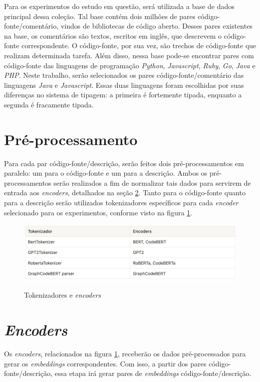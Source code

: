 Para os experimentos do estudo em questão, será utilizada a base de dados principal dessa coleção. Tal base contém dois milhões de pares código-fonte/comentário, vindos de bibliotecas de código aberto. Desses pares existentes na base, os comentários são textos, escritos em inglês, que descrevem o código-fonte correspondente. O código-fonte, por sua vez, são trechos de código-fonte que realizam determinada tarefa. Além disso, nessa base pode-se encontrar pares com código-fonte das linguagens de programação \textit{Python}, \textit{Javascript}, \textit{Ruby}, \textit{Go}, \textit{Java} e \textit{PHP}. Neste trabalho, serão selecionados os pares código-fonte/comentário das linguagens \textit{Java} e \textit{Javascript}. Essas duas linguagens foram escolhidas por suas diferenças no sistema de tipagem: a primeira é fortemente tipada, enquanto a segunda é fracamente tipada.

\section{Pré-processamento}
\label{sec:methodology:pre-processing}
Para cada par código-fonte/descrição, serão feitos dois pré-processamentos em paralelo: um para o código-fonte e um para a descrição. Ambos os pré-processamentos serão realizados a fim de normalizar tais dados para servirem de entrada aos \textit{encoders}, detalhados na seção \ref{sec:methodology:encoders}. Tanto para o código-fonte quanto para a descrição serão utilizados tokenizadores específicos para cada \textit{encoder} selecionado para os experimentos, conforme visto na figura \ref{fig:metodology-tokenizers}.

\begin{figure}[htbp]
    \centering
        \caption{Tokenizadores e \textit{encoders}}
        \includegraphics[scale=0.5]{tokenizers.png}
        \label{fig:metodology-tokenizers}
\end{figure}

\section{\textit{Encoders}}
\label{sec:methodology:encoders}
Os \textit{encoders}, relacionados na figura \ref{fig:metodology-tokenizers}, receberão os dados pré-processados para gerar os \textit{embeddings} correspondentes. Com isso, a partir dos pares código-fonte/descrição, essa etapa irá gerar pares de \textit{embeddings} código-fonte/descrição.

